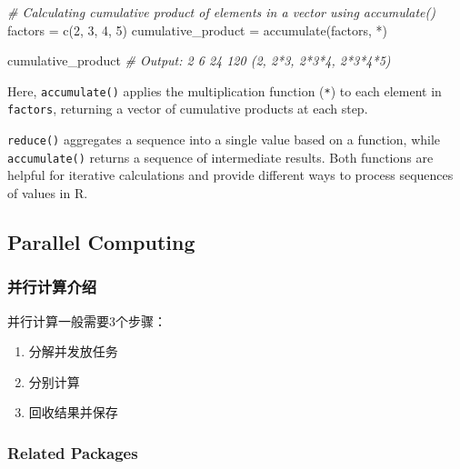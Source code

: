 \documentclass[
]{article}
\newenvironment{Shaded}{}{}
\newcommand{\AttributeTok}[1]{\textcolor[rgb]{0.49,0.56,0.16}{#1}}
\newcommand{\CommentTok}[1]{\textcolor[rgb]{0.38,0.63,0.69}{\textit{#1}}}
\newcommand{\DecValTok}[1]{\textcolor[rgb]{0.25,0.63,0.44}{#1}}
\newcommand{\FunctionTok}[1]{\textcolor[rgb]{0.02,0.16,0.49}{#1}}
\newcommand{\NormalTok}[1]{#1}
\newcommand{\OtherTok}[1]{\textcolor[rgb]{0.00,0.44,0.13}{#1}}
\newcommand{\StringTok}[1]{\textcolor[rgb]{0.25,0.44,0.63}{#1}}
\begin{document}
\begin{enumerate}
\begin{Shaded}
\begin{Highlighting}[]
\CommentTok{\# Calculating cumulative product of elements in a vector using accumulate()}
\NormalTok{factors }\OtherTok{=} \FunctionTok{c}\NormalTok{(}\DecValTok{2}\NormalTok{, }\DecValTok{3}\NormalTok{, }\DecValTok{4}\NormalTok{, }\DecValTok{5}\NormalTok{)}
\NormalTok{cumulative\_product }\OtherTok{=} \FunctionTok{accumulate}\NormalTok{(factors, }\StringTok{\textasciigrave{}}\AttributeTok{*}\StringTok{\textasciigrave{}}\NormalTok{)}

\NormalTok{cumulative\_product}
\CommentTok{\# Output: 2 6 24 120 (2, 2*3, 2*3*4, 2*3*4*5)}
\end{Highlighting}
\end{Shaded}

  Here, \texttt{accumulate()} applies the multiplication function
  (\texttt{*}) to each element in \texttt{factors}, returning a vector
  of cumulative products at each step.
\end{enumerate}

\texttt{reduce()} aggregates a sequence into a single value based on a
function, while \texttt{accumulate()} returns a sequence of intermediate
results. Both functions are helpful for iterative calculations and
provide different ways to process sequences of values in R.

\hypertarget{parallel-computing}{%
\subsection{Parallel Computing}\label{parallel-computing}}

\hypertarget{ux5e76ux884cux8ba1ux7b97ux4ecbux7ecd}{%
\subsubsection{并行计算介绍}\label{ux5e76ux884cux8ba1ux7b97ux4ecbux7ecd}}

并行计算一般需要3个步骤：

\begin{enumerate}
\def\labelenumi{\arabic{enumi}.}
\item
  分解并发放任务
\item
  分别计算
\item
  回收结果并保存
\end{enumerate}

\hypertarget{related-packages}{%
\subsubsection{Related Packages}\label{related-packages}}
\end{document}

